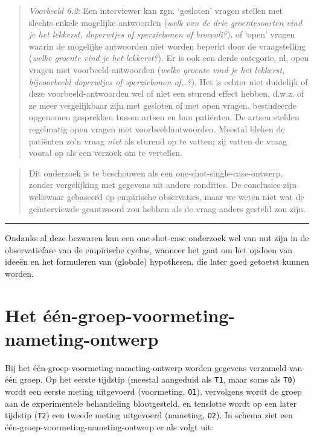 \documentclass[
]{book}
\begin{document}
\begin{quote}
\emph{Voorbeeld 6.2}: Een interviewer kan zgn. `gesloten' vragen stellen met slechts enkele
mogelijke antwoorden (\emph{welk van de drie groentesoorten vind je het
lekkerst, doperwtjes of sperziebonen of broccoli?}), of `open' vragen
waarin de mogelijke antwoorden niet worden beperkt door de vraagstelling
(\emph{welke groente vind je het lekkerst?}). Er is ook een derde categorie,
nl. open vragen met voorbeeld-antwoorden (\emph{welke groente vind je het
lekkerst, bijvoorbeeld doperwtjes of sperziebonen of\ldots?}). Het is
echter niet duidelijk of deze voorbeeld-antwoorden wel of niet een
sturend effect hebben, d.w.z. of ze meer vergelijkbaar zijn met gesloten
of met open vragen. \citep{Houtk91} bestudeerde opgenomen gesprekken tussen
artsen en hun patiënten. De artsen stelden regelmatig open vragen met
voorbeeldantwoorden. Meestal bleken de patiënten zo'n vraag \emph{niet} als
sturend op te vatten; zij vatten de vraag vooral op als een verzoek om
te vertellen.
\end{quote}

\begin{quote}
Dit onderzoek is te beschouwen als een one-shot-single-case-ontwerp,
zonder vergelijking met gegevens uit andere condities. De conclusies
zijn weliswaar gebaseerd op empirische observaties, maar we weten niet
wat de geïnterviewde geantwoord zou hebben als de vraag anders gesteld
zou zijn.
\end{quote}

\begin{center}\rule{0.5\linewidth}{0.5pt}\end{center}

Ondanks al deze bezwaren kan een one-shot-case onderzoek wel van nut
zijn in de observatiefase van de empirische cyclus, wanneer het gaat om
het opdoen van ideeën en het formuleren van (globale) hypothesen, die
later goed getoetst kunnen worden.

\hypertarget{het-uxe9uxe9n-groep-voormeting-nameting-ontwerp}{%
\section{Het één-groep-voormeting-nameting-ontwerp}\label{het-uxe9uxe9n-groep-voormeting-nameting-ontwerp}}

Bij het één-groep-voormeting-nameting-ontwerp worden gegevens verzameld
van één groep. Op het eerste tijdstip (meestal aangeduid als \texttt{T1}, maar
soms als \texttt{T0}) wordt een eerste meting uitgevoerd (voormeting, \texttt{O1}),
vervolgens wordt de groep aan de experimentele behandeling blootgesteld,
en tenslotte wordt op een later tijdstip (\texttt{T2}) een tweede meting
uitgevoerd (nameting, \texttt{O2}). In schema ziet een
één-groep-voormeting-nameting-ontwerp er als volgt uit:
\end{document}
